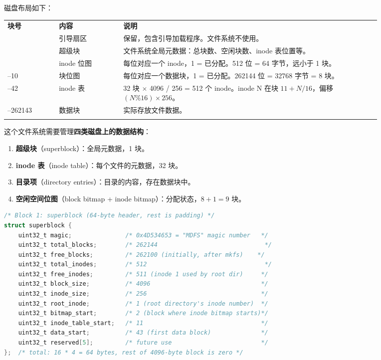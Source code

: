 \begin{filesystemlayout}
磁盘布局如下：

\begin{longtable}{|F{0.12\linewidth}|F{0.15\linewidth}|F{0.60\linewidth}|}
\hline
{}
\textbf{块号} & \textbf{内容} & \textbf{说明} \\\tablerowrule
{} & 引导扇区 & 保留，包含引导加载程序。文件系统不使用。 \\ & 超级块 & 文件系统全局元数据：总块数、空闲块数、inode 表位置等。 \\ & inode 位图 & 每位对应一个 inode，1 = 已分配。512 位 = 64 字节，远小于 1 块。 \\--10 & 块位图 & 每位对应一个数据块，1 = 已分配。262144 位 = 32768 字节 = 8 块。 \\--42 & inode 表 & 32 块 $\times$ 4096 / 256 = 512 个 inode。inode N 在块 $11 + N/16$，偏移 $(N\%16) \times 256$。 \\--262143 & 数据块 & 实际存放文件数据。 \\\tablerowrule
\end{longtable}

这个文件系统需要管理\textbf{四类磁盘上的数据结构}：

\begin{enumerate}\tightlist
\item \textbf{超级块}（superblock）：全局元数据，1 块。
\item \textbf{inode 表}（inode table）：每个文件的元数据，32 块。
\item \textbf{目录项}（directory entries）：目录的内容，存在数据块中。
\item \textbf{空闲空间位图}（block bitmap + inode bitmap）：分配状态，$8 + 1 = 9$ 块。
\end{enumerate}


\begin{lstlisting}[language=C]
/* Block 1: superblock (64-byte header, rest is padding) */
struct superblock {
    uint32_t magic;               /* 0x4D534653 = "MDFS" magic number   */
    uint32_t total_blocks;        /* 262144                              */
    uint32_t free_blocks;         /* 262100 (initially, after mkfs)    */
    uint32_t total_inodes;        /* 512                                 */
    uint32_t free_inodes;         /* 511 (inode 1 used by root dir)     */
    uint32_t block_size;          /* 4096                               */
    uint32_t inode_size;          /* 256                                */
    uint32_t root_inode;          /* 1 (root directory's inode number)  */
    uint32_t bitmap_start;        /* 2 (block where inode bitmap starts)*/
    uint32_t inode_table_start;   /* 11                                 */
    uint32_t data_start;          /* 43 (first data block)              */
    uint32_t reserved[5];         /* future use                         */
};  /* total: 16 * 4 = 64 bytes, rest of 4096-byte block is zero */
\end{lstlisting}


\end{filesystemlayout}
